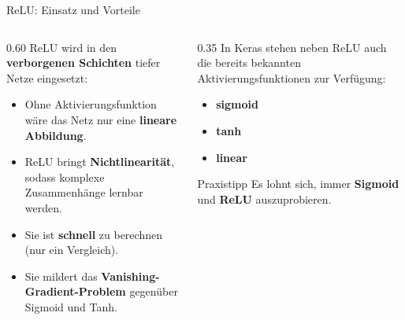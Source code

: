 \begin{frame}{ReLU: Einsatz und Vorteile}
\footnotesize
\begin{columns}
\begin{column}{0.60\textwidth}
ReLU wird in den \textbf{verborgenen Schichten} tiefer Netze eingesetzt:
\begin{itemize}
\item Ohne Aktivierungsfunktion wäre das Netz nur eine \textbf{lineare Abbildung}.
\item ReLU bringt \textbf{Nichtlinearität}, sodass komplexe Zusammenhänge lernbar werden.
\item Sie ist \textbf{schnell} zu berechnen (nur ein Vergleich).
\item Sie mildert das \textbf{Vanishing-Gradient-Problem} gegenüber Sigmoid und Tanh.
\end{itemize}
\end{column}
\begin{column}{0.35\textwidth}
In Keras stehen neben ReLU auch die bereits bekannten Aktivierungsfunktionen zur Verfügung:
\begin{itemize}
\item \textbf{sigmoid}
\item \textbf{tanh}
\item \textbf{linear}
\end{itemize}

\begin{blockC2}{\footnotesize Praxistipp}
  Es lohnt sich, immer \textbf{Sigmoid} und \textbf{ReLU} auszuprobieren. 
\end{blockC2}
\end{column}
\end{columns}
\end{frame}


